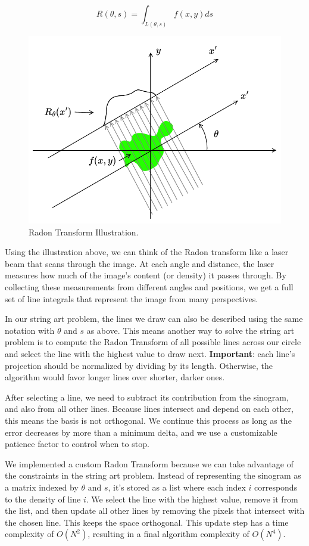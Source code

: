 \begin{equation}  
R(\theta, s) = \int_{L(\theta, s)} f(x, y)ds
\end{equation}

\begin{figure}[H]
    \centering
    \includegraphics[width=0.6\linewidth]{images/radon.pdf}
    \caption{Radon Transform Illustration.}
    \label{fig:radon_illustration}
\end{figure}

Using the illustration above, we can think of the Radon transform like a laser beam that scans through the image. At each angle and distance, the laser measures how much of the image’s content (or density) it passes through. By collecting these measurements from different angles and positions, we get a full set of line integrals that represent the image from many perspectives.

In our string art problem, the lines we draw can also be described using the same notation with \(\theta\) and \(s\) as above. This means another way to solve the string art problem is to compute the Radon Transform of all possible lines across our circle and select the line with the highest value to draw next. \textbf{Important}: each line’s projection should be normalized by dividing by its length. Otherwise, the algorithm would favor longer lines over shorter, darker ones.

After selecting a line, we need to subtract its contribution from the sinogram, and also from all other lines. Because lines intersect and depend on each other, this means the basis is not orthogonal. We continue this process as long as the error decreases by more than a minimum delta, and we use a customizable patience factor to control when to stop.

We implemented a custom Radon Transform because we can take advantage of the constraints in the string art problem. Instead of representing the sinogram as a matrix indexed by \(\theta\) and \(s\), it’s stored as a list where each index \(i\) corresponds to the density of line \(i\). We select the line with the highest value, remove it from the list, and then update all other lines by removing the pixels that intersect with the chosen line. This keeps the space orthogonal. This update step has a time complexity of \(O(N^2)\), resulting in a final algorithm complexity of \(O(N^4)\).


